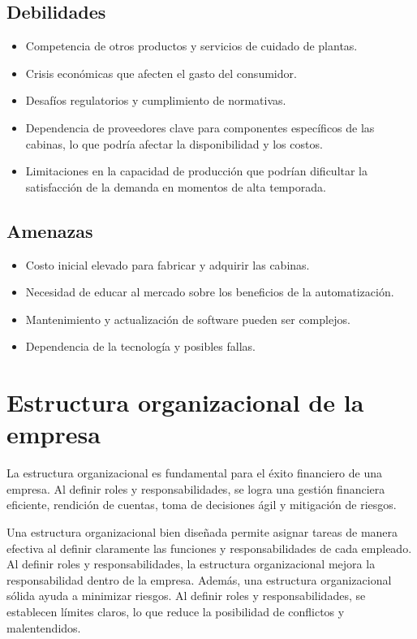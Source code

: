 \subsection{Debilidades}

\begin{itemize}
    \item Competencia de otros productos y servicios de cuidado de plantas.
    \item Crisis económicas que afecten el gasto del consumidor.
    \item Desafíos regulatorios y cumplimiento de normativas.
    \item Dependencia de proveedores clave para componentes específicos de las cabinas, lo que podría afectar la disponibilidad y los costos.
    \item Limitaciones en la capacidad de producción que podrían dificultar la satisfacción de la demanda en momentos de alta temporada.

    
    
\end{itemize}

\subsection{Amenazas}

\begin{itemize}
    \item Costo inicial elevado para fabricar y adquirir las cabinas.
    \item Necesidad de educar al mercado sobre los beneficios de la automatización.
    \item Mantenimiento y actualización de software pueden ser complejos.
    \item Dependencia de la tecnología y posibles fallas.
\end{itemize}

\section{Estructura organizacional de la empresa}

La estructura organizacional es fundamental para el éxito financiero de una empresa. Al definir roles y responsabilidades, se logra una gestión financiera eficiente, rendición de cuentas, toma de decisiones ágil y mitigación de riesgos.

Una estructura organizacional bien diseñada permite asignar tareas de manera efectiva al definir claramente las funciones y responsabilidades de cada empleado. Al definir roles y responsabilidades, la estructura organizacional mejora la responsabilidad dentro de la empresa. Además, una estructura organizacional sólida ayuda a minimizar riesgos. Al definir roles y responsabilidades, se establecen límites claros, lo que reduce la posibilidad de conflictos y malentendidos.

